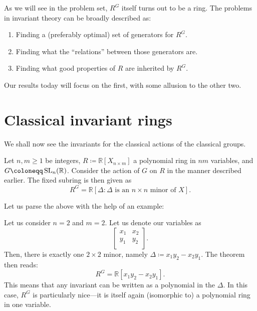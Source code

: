 \documentclass[12pt]{article}
\begin{document}
	As we will see in the problem set, $R^{G}$ itself turns out to be a ring. 
	The problems in invariant theory can be broadly described as:
	\begin{enumerate}[label=(\roman*)]
		\item Finding a (preferably optimal) set of generators for $R^{G}$.
		\item Finding what the ``relations'' between those generators are.
		\item Finding what good properties of $R$ are inherited by $R^{G}$.
	\end{enumerate}

	Our results today will focus on the first, with some allusion to the other two.

\section{Classical invariant rings}

	We shall now see the invariants for the classical actions of the classical groups. 

	\begin{thm}
		Let $n, m \ge 1$ be integers, 
		$R \coloneqq \mathbb{R}[X_{n \times m}]$ a polynomial ring in $n m$ variables, 
		and $G \coloneqq \SL_{n}(\mathbb{R})$. 
		Consider the action of $G$ on $R$ in the manner described earlier. 
		The fixed subring is then given as
		\begin{equation*} 
			R^{G} = \mathbb{R}[\Delta : \Delta \text{ is an $n \times n$ minor of $X$}].
		\end{equation*}
	\end{thm}

	Let us parse the above with the help of an example:

	\begin{ex}
		Let us consider $n = 2$ and $m = 2$. 
		Let us denote our variables as
		\begin{equation*} 
			\begin{bmatrix}
				x_{1} & x_{2} \\
				y_{1} & y_{2} \\
			\end{bmatrix}.
		\end{equation*}
		Then, there is exactly one $2 \times 2$ minor, 
		namely $\Delta \coloneqq x_{1} y_{2} - x_{2} y_{1}$. 
		The theorem then reads:
		\begin{equation*} 
			R^{G} = \mathbb{R}[x_{1} y_{2} - x_{2} y_{1}].
		\end{equation*}
		This means that any invariant can be written as a polynomial in the $\Delta$. 
		In this case, $R^{G}$ is particularly nice---it is itself again (isomorphic to) a polynomial ring in one variable.
	\end{ex}
\end{document}
